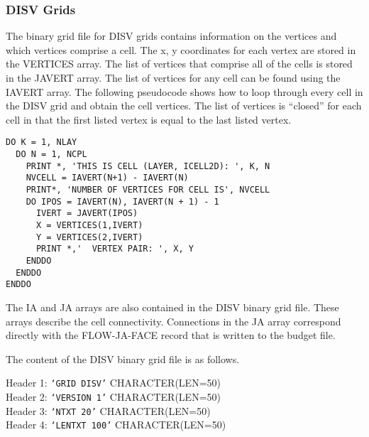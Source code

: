 \newpage
\subsubsection{DISV Grids}

The binary grid file for DISV grids contains information on the vertices and which vertices comprise a cell.  The x, y coordinates for each vertex are stored in the VERTICES array.  The list of vertices that comprise all of the cells is stored in the JAVERT array.  The list of vertices for any cell can be found using the IAVERT array.  The following pseudocode shows how to loop through every cell in the DISV grid and obtain the cell vertices.  The list of vertices is ``closed'' for each cell in that the first listed vertex is equal to the last listed vertex.  

\begin{verbatim}
DO K = 1, NLAY
  DO N = 1, NCPL
    PRINT *, 'THIS IS CELL (LAYER, ICELL2D): ', K, N
    NVCELL = IAVERT(N+1) - IAVERT(N)
    PRINT*, 'NUMBER OF VERTICES FOR CELL IS', NVCELL
    DO IPOS = IAVERT(N), IAVERT(N + 1) - 1
      IVERT = JAVERT(IPOS)
      X = VERTICES(1,IVERT)
      Y = VERTICES(2,IVERT)
      PRINT *,'  VERTEX PAIR: ', X, Y
    ENDDO
  ENDDO
ENDDO
\end{verbatim}

The IA and JA arrays are also contained in the DISV binary grid file.  These arrays describe the cell connectivity.  Connections in the JA array correspond directly with the FLOW-JA-FACE record that is written to the budget file.

The content of the DISV binary grid file is as follows.

\vspace{5mm}
\noindent Header 1: \texttt{`GRID DISV'}  {\color{red} \footnotesize{CHARACTER(LEN=50)}} \\
\noindent Header 2: \texttt{`VERSION 1'}  {\color{red} \footnotesize{CHARACTER(LEN=50)}} \\
\noindent Header 3: \texttt{`NTXT 20'} {\color{red} \footnotesize{CHARACTER(LEN=50)}}\\
\noindent Header 4: \texttt{`LENTXT 100'} {\color{red} \footnotesize{CHARACTER(LEN=50)}}\\

